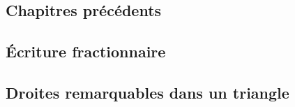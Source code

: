 

\begin{multicols}{2}

\subsection{Chapitres précédents}


\subsection{Écriture fractionnaire}


\subsection{Droites remarquables dans un triangle}


\end{multicols}

